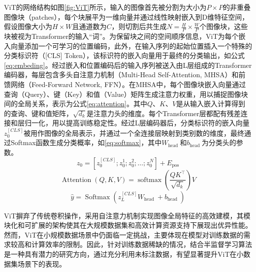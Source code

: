 \documentclass[lang=chs, degree=master, blindreview=false, adobe=false]{yanputhesis}
\begin{document}
ViT的网络结构如图\ref{fig:ViT}所示，输入的图像首先被分割为大小为$P\times P$的非重叠图像块（patches），每个块展平为一维向量并通过线性映射嵌入到D维特征空间，假设图像大小为$H \times W$且通道数为$C$，则切割后共生成$N=\frac{H}{P} \times \frac{W}{P}$个图像块，这些块被视为Transformer的输入“词”。为保留块之间的空间顺序信息，ViT为每个嵌入向量添加一个可学习的位置编码，此外，在输入序列的起始位置插入一个特殊的分类标识符（[CLS] Token），该标识符的嵌入向量用于最终的分类输出，如公式\ref{eq:embeding}。经过嵌入和位置编码后的输入序列被送入由L层组成的Transformer编码器，每层包含多头自注意力机制（Multi-Head Self-Attention, MHSA）和前馈网络（Feed-Forward Network, FFN）。在MHSA中，每个图像块嵌入向量通过查询（Query）、键（Key）和值（Value）矩阵生成注意力权重，用以捕捉图像块间的全局关系，表示为公式\ref{eq:attention}。其中$Q$、$K$、$V$是从输入嵌入计算得到的查询、键和值矩阵，$\sqrt{d_{k}}$是注意力头的维度。每个Transformer层都配有残差连接和层归一化，用以提高训练稳定性。经过L层编码器后，分类标识符的嵌入向量$z_{0}^{[C L S]}$被用作图像的全局表示，并通过一个全连接层映射到类别数的维度，最终通过Softmax函数生成分类概率，如\autoref{eq:softmax}，其中$W_{\text {head }}$和$b_{\text {head }}$为分类头的参数。
\begin{equation}
  \label{eq:embeding}
  z_{0}=\left[z_{0}^{[C L S]} ; z_{0}^{1} ; z_{0}^{2} ; \ldots ; z_{0}^{N}\right]+E_{\mathrm{pos}}
\end{equation}
\begin{equation}
  \label{eq:attention}
\operatorname{Attention}(Q, K, V)=\operatorname{softmax}\left(\frac{Q K^{\top}}{\sqrt{d_{k}}}\right) V
\end{equation}
\begin{equation}
  \label{eq:softmax}
  \hat{y}=\operatorname{Softmax}\left(z_{L}^{[C L S]} W_{\text {head }}+b_{\text {head }}\right)
\end{equation}

ViT摒弃了传统卷积操作，采用自注意力机制实现图像全局特征的高效建模，其模块化和可扩展的架构使其在大规模数据集和高效计算资源支持下展现出优异性能。然而，ViT在小规模数据场景中仍面临一定挑战，主要体现在模型对训练数据的需求较高和计算效率的限制。因此，针对训练数据稀缺的情况，结合半监督学习算法是一种具有潜力的研究方向，通过充分利用未标注数据，有望显著提升ViT在小数据集场景下的表现。
\end{document}
